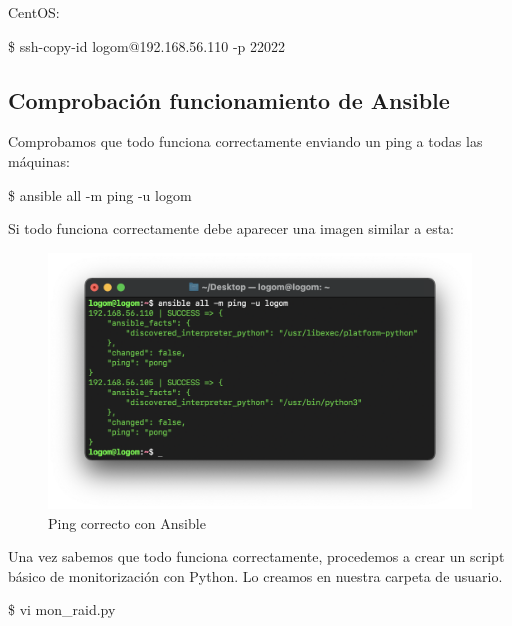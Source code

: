 CentOS:
    \begin{tcolorbox}[colback=black!10, halign=left]
        \$ ssh-copy-id logom@192.168.56.110 -p 22022
    \end{tcolorbox}

\subsection{Comprobación funcionamiento de Ansible}
Comprobamos que todo funciona correctamente enviando un ping a todas las máquinas:
    \begin{tcolorbox}[colback=black!10, halign=left]
        \$ ansible all -m ping -u logom
    \end{tcolorbox}

Si todo funciona correctamente debe aparecer una imagen similar a esta:
    \begin{figure}[H]
        \centering
        \includegraphics[scale=0.5]{images/ansible_ping.png}
        \caption{Ping correcto con Ansible}
        \label{fig:ansible_ping}
    \end{figure}

Una vez sabemos que todo funciona correctamente, procedemos a crear un script básico de monitorización con Python. Lo creamos en nuestra carpeta de usuario.
    \begin{tcolorbox}[colback=black!10, halign=left]
        \$ vi mon\_raid.py
    \end{tcolorbox}


